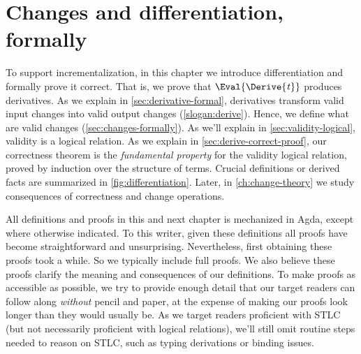









\def\deriveDefCore{%
\begin{align*}
  \ensuremath{\Derive{\lambda (\Varid{x}\typcolon\sigma)\to \Varid{t}}} &= \ensuremath{\lambda (\Varid{x}\typcolon\sigma)\;(\Varid{dx}\typcolon\Delta \sigma)\to \Derive{\Varid{t}}} \\
  \ensuremath{\Derive{\Varid{s}\;\Varid{t}}} &= \ensuremath{\Derive{\Varid{s}}\;\Varid{t}\;\Derive{\Varid{t}}} \\
  \ensuremath{\Derive{\Varid{x}}} &= \ensuremath{\Varid{dx}} \\
  \ensuremath{\Derive{\Varid{c}}} &= \ensuremath{\DeriveConst{\Varid{c}}}
\end{align*}
}




\chapter{Changes and differentiation, formally}
\label{ch:derive-formally}


To support incrementalization, in this chapter we introduce differentiation and
formally prove it correct. That is, we prove that \ensuremath{\Eval{\Derive{\Varid{t}}}} produces
derivatives. As we explain in \cref{sec:derivative-formal}, derivatives
transform valid input changes into valid output changes (\cref{slogan:derive}).
Hence, we define what are valid changes (\cref{sec:changes-formally}). As we'll
explain in \cref{sec:validity-logical}, validity is a logical relation. As we
explain in \cref{sec:derive-correct-proof}, our correctness theorem is the
\emph{fundamental property} for the validity logical relation, proved by induction
over the structure of terms.
%
Crucial definitions or derived facts are summarized in \cref{fig:differentiation}.
%
Later, in \cref{ch:change-theory} we study consequences of correctness and
change operations.

All definitions and proofs in this and next chapter is mechanized in Agda,
except where otherwise indicated. To this writer, given these definitions all
proofs have become straightforward and unsurprising. Nevertheless, first
obtaining these proofs took a while. So we typically include full proofs.
We also believe these proofs clarify the meaning and consequences of our definitions.
To make proofs as accessible as possible, we try to provide enough detail that
our target readers can follow along \emph{without} pencil and paper, at the
expense of making our proofs look longer than they would usually be. As we
target readers proficient with STLC (but not necessarily proficient with logical
relations), we'll still omit routine steps needed to reason on STLC, such as
typing derivations or binding issues.

